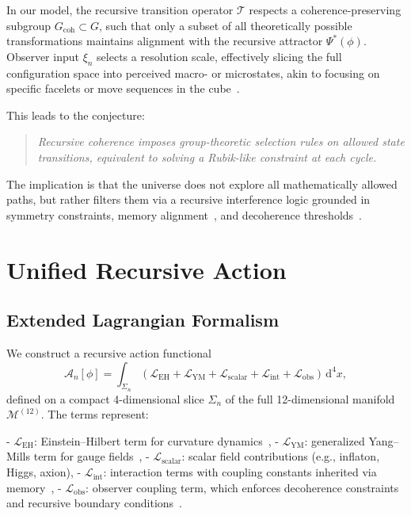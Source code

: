 \documentclass[11pt]{article}
\begin{document}
In our model, the recursive transition operator $\mathcal{T}$ respects a coherence-preserving subgroup $G_{\text{coh}} \subset G$, such that only a subset of all theoretically possible transformations maintains alignment with the recursive attractor $\Psi^*(\phi)$. Observer input $\xi_n$ selects a resolution scale, effectively slicing the full configuration space into perceived macro- or microstates, akin to focusing on specific facelets or move sequences in the cube~\cite{zurek2003decoherence}.

This leads to the conjecture:

\begin{quote}
\textit{Recursive coherence imposes group-theoretic selection rules on allowed state transitions, equivalent to solving a Rubik-like constraint at each cycle.}
\end{quote}

The implication is that the universe does not explore all mathematically allowed paths, but rather filters them via a recursive interference logic grounded in symmetry constraints, memory alignment~\cite{maldacena2013cool}, and decoherence thresholds~\cite{zurek2003decoherence, nielsen2010quantum}.


\section{Unified Recursive Action}

\subsection{Extended Lagrangian Formalism}

We construct a recursive action functional
\[
\mathcal{A}_n[\phi] = \int_{\Sigma_n} \left( \mathcal{L}_{\text{EH}} + \mathcal{L}_{\text{YM}} + \mathcal{L}_{\text{scalar}} + \mathcal{L}_{\text{int}} + \mathcal{L}_{\text{obs}} \right) \, \mathrm{d}^4 x,
\]
defined on a compact 4-dimensional slice $\Sigma_n$ of the full 12-dimensional manifold $\mathcal{M}^{(12)}$. The terms represent:

- $\mathcal{L}_{\text{EH}}$: Einstein–Hilbert term for curvature dynamics~\cite{peskin1995introduction},
- $\mathcal{L}_{\text{YM}}$: generalized Yang–Mills term for gauge fields~\cite{peskin1995introduction},
- $\mathcal{L}_{\text{scalar}}$: scalar field contributions (e.g., inflaton, Higgs, axion),
- $\mathcal{L}_{\text{int}}$: interaction terms with coupling constants inherited via memory~\cite{ashtekar2006quantum},
- $\mathcal{L}_{\text{obs}}$: observer coupling term, which enforces decoherence constraints and recursive boundary conditions~\cite{zurek2003decoherence, nielsen2010quantum}.
\end{document}
